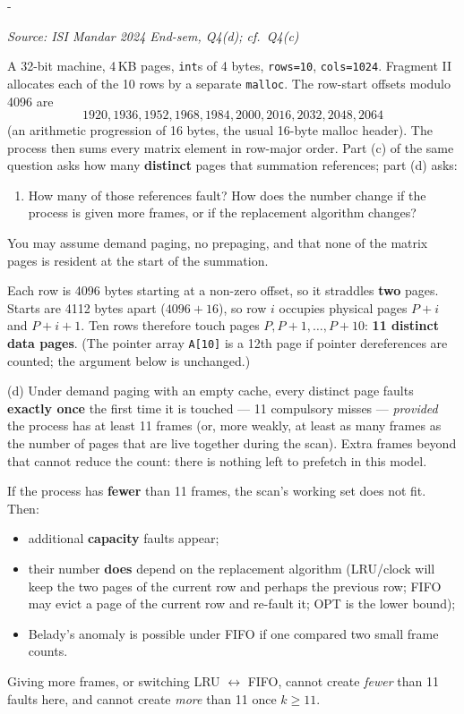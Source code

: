 \documentclass[11pt,a4paper]{article}
\makeatletter
\newcommand{\keepspace}[1]{\par\penalty-100\begingroup
  \setlength{\dimen@}{#1}\dimen@ii\pagegoal\advance\dimen@ii-\pagetotal
  \ifdim\dimen@>\dimen@ii\ifdim\dimen@ii>\z@\vfil\fi\break\fi\endgroup}
\newcounter{qn}[section]
\newenvironment{Qn}[4]{%
  \refstepcounter{qn}\keepspace{7\baselineskip}%
  \begin{tcolorbox}[qboxstyle, title={Q\thesection.\theqn\ \ [#1 \textbar\ #2]\ \ #4}]%
  {\footnotesize\color{g3}\textit{Source: #3}}\par\smallskip%
}{%
  \end{tcolorbox}%
}
\newenvironment{Sol}{%
  \begin{tcolorbox}[sboxstyle, title={Solution}]%
}{%
  \end{tcolorbox}\vspace{0.35em}%
}
\makeatother
\begin{document}
\begin{Qn}{Medium}{Lect 15}{ISI Mandar 2024 End-sem, Q4(d); cf.\ Q4(c)}{Compulsory faults vs.\ extra frames and the replacement algorithm}
A 32-bit machine, 4\,KB pages, \texttt{int}s of 4 bytes,
\texttt{rows=10}, \texttt{cols=1024}. Fragment II allocates each of
the 10 rows by a separate \texttt{malloc}. The row-start offsets
modulo 4096 are
\[
1920,1936,1952,1968,1984,2000,2016,2032,2048,2064
\]
(an arithmetic progression of 16 bytes, the usual 16-byte malloc
header). The process then sums every matrix element in row-major
order. Part (c) of the same question asks how many \textbf{distinct}
pages that summation references; part (d) asks:
\begin{enumerate}
  \item[(d)] How many of those references fault? How does the number
        change if the process is given more frames, or if the
        replacement algorithm changes?
\end{enumerate}
You may assume demand paging, no prepaging, and that none of the
matrix pages is resident at the start of the summation.
\end{Qn}
\begin{Sol}
Each row is 4096 bytes starting at a non-zero offset, so it straddles
\textbf{two} pages. Starts are 4112 bytes apart ($4096+16$), so row
$i$ occupies physical pages $P+i$ and $P+i+1$. Ten rows therefore
touch pages $P,P+1,\ldots,P+10$: \textbf{11 distinct data pages}.
(The pointer array \texttt{A[10]} is a 12th page if pointer
dereferences are counted; the argument below is unchanged.)

(d) Under demand paging with an empty cache, every distinct page
faults \textbf{exactly once} the first time it is touched --- 11
compulsory misses --- \emph{provided} the process has at least 11
frames (or, more weakly, at least as many frames as the number of
pages that are live together during the scan). Extra frames beyond
that cannot reduce the count: there is nothing left to prefetch in
this model.

If the process has \textbf{fewer} than 11 frames, the scan's working
set does not fit. Then:
\begin{itemize}
  \item additional \textbf{capacity} faults appear;
  \item their number \textbf{does} depend on the replacement algorithm
        (LRU/clock will keep the two pages of the current row and
        perhaps the previous row; FIFO may evict a page of the current
        row and re-fault it; OPT is the lower bound);
  \item Belady's anomaly is possible under FIFO if one compared two
        small frame counts.
\end{itemize}
Giving more frames, or switching LRU $\leftrightarrow$ FIFO, cannot
create \emph{fewer} than 11 faults here, and cannot create
\emph{more} than 11 once $k\ge 11$.
\end{Sol}
\end{document}
